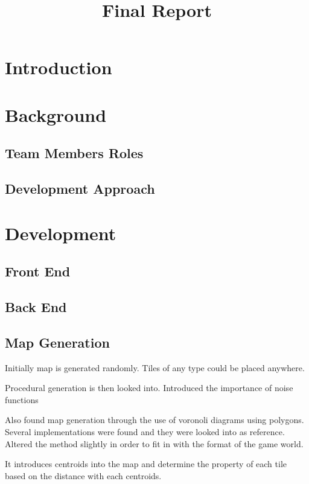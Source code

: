 \documentclass{article}
\begin{document}
\title{Final Report}
\date{}

\section*{Introduction}

\section*{Background}








\subsection*{Team Members Roles}

\subsection*{Development Approach}

\section*{Development}
\subsection*{Front End}
\subsection*{Back End}
\subsection*{Map Generation}

Initially map is generated randomly. Tiles of any type could be placed anywhere.

Procedural generation is then looked into. Introduced the importance of noise functions


Also found map generation through the use of voronoli diagrams using polygons. Several implementations were found and they were looked into as reference. Altered the method slightly in order to fit in with the format of the game world. 

It introduces centroids into the map and determine the property of each tile based on the distance with each centroids.
\end{document}
